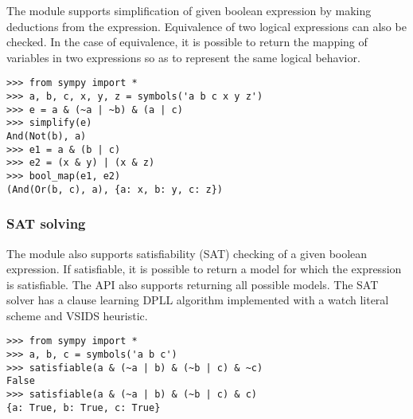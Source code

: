 The module supports simplification of given boolean expression by making
deductions from the expression. Equivalence of two logical expressions can also
be checked. In the case of equivalence, it is possible to return the mapping of
variables in two expressions so as to represent the same logical behavior.

\begin{verbatim}
>>> from sympy import *
>>> a, b, c, x, y, z = symbols('a b c x y z')
>>> e = a & (~a | ~b) & (a | c)
>>> simplify(e)
And(Not(b), a)
>>> e1 = a & (b | c)
>>> e2 = (x & y) | (x & z)
>>> bool_map(e1, e2)
(And(Or(b, c), a), {a: x, b: y, c: z})
\end{verbatim}

\subsubsection{SAT solving}

The module also supports satisfiability (SAT) checking of a given boolean
expression. If satisfiable, it is possible to return a model for which the
expression is satisfiable. The API also supports returning all possible models.
The SAT solver has a clause learning DPLL algorithm implemented with a watch
literal scheme and VSIDS heuristic\cite{moskewicz2008method}.

\begin{verbatim}
>>> from sympy import *
>>> a, b, c = symbols('a b c')
>>> satisfiable(a & (~a | b) & (~b | c) & ~c)
False
>>> satisfiable(a & (~a | b) & (~b | c) & c)
{a: True, b: True, c: True}
\end{verbatim}
